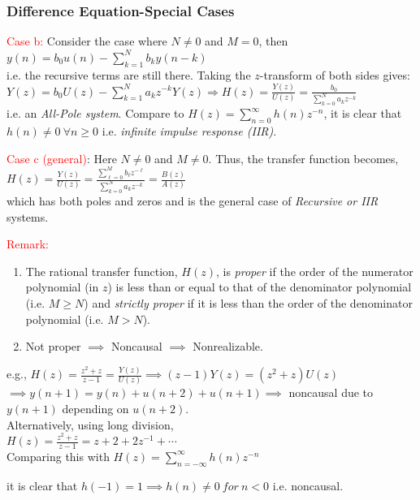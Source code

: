 \documentclass[mathserif, 10pt]{beamer} %
\begin{document}
\frame
{

\normalsize
\frametitle{Difference Equation-Special Cases}

\textcolor{red}{Case b:} Consider the case where $N \ne 0$ and $M = 0$, then \\
$y(n) = b_0 u(n) - \sum\limits_{k=1}^N b_k y(n-k)$\\
i.e. the recursive terms are still there.  Taking the $z$-transform of both sides gives:\\
$Y(z) = b_0U(z)-\sum\limits_{k=1}^N a_{k} z^{-k} Y(z) \Longrightarrow H(z) = \frac{Y(z)}{U(z)}=\frac{b_0}{\sum\limits_{k=0}^N a_{k} z^{-k}}$\\
i.e. an \textit{All-Pole system}.  Compare to $H(z) = \sum\limits_{n=0}^\infty  h(n) z^{-n}$, it is clear that $h(n)\neq 0 ~\forall n\geq0$
i.e. \textit{infinite impulse response (IIR)}.

\vspace{.05in}
\textcolor{red}{Case c (general)}: Here $N \ne 0$ and $M \ne 0$.  Thus, the transfer
function becomes, \\
$H(z) = \frac{Y(z)}{U(z)} = \frac{\sum\limits_{\ell = 0}^{M} b_{\ell} z^{-\ell}}{\sum\limits_{k=0}^N a_k z^{-k}} = \frac{B(z)}{A(z)}$\\
which has both poles and zeros and is the general case of \textit{Recursive or IIR} systems.

}

\frame
{

\normalsize

\textcolor{red}{Remark:}
\begin{enumerate}
	\item The rational transfer function, $H(z)$, is \textit{proper} if the order of the numerator polynomial (in $z$) is less than or equal to that of the denominator polynomial (i.e. $M \ge N$) and
\textit{strictly proper} if it is less than the order of the denominator polynomial (i.e. $M > N$).
 	\item Not proper $\implies$ Noncausal $\implies$ Nonrealizable. \\
\end{enumerate}
\vspace{.1in}

e.g., $H(z) = \frac{z^2+z}{z-1}=\frac{Y(z)}{U(z)} \implies (z-1)Y(z) = (z^2+z)U(z)$\\
$\implies y(n+1) = y(n) + u(n+2) +u(n+1) \implies$ noncausal due to $y(n+1)$ depending on $u(n+2)$. \\

Alternatively, using long division,\\

$H(z) = \frac{z^2+z}{z-1}= z+2+2z^{-1}+\cdots$\\
Comparing this with $H(z) = \sum\limits_{n=-\infty}^\infty h(n) z^{-n}$

it is clear that $h(-1)=1 \implies h(n) \ne 0~for~n<0$ i.e. noncausal.\\

}
\end{document}
